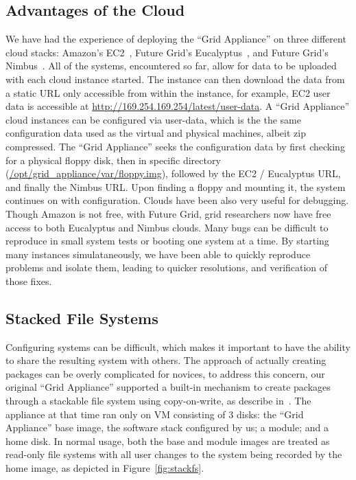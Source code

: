 \documentclass[conference]{IEEEtran}
\begin{document}
\subsection{Advantages of the Cloud}

We have had the experience of deploying the ``Grid Appliance'' on three
different cloud stacks:  Amazon's EC2~\cite{ec2}, Future Grid's
Eucalyptus~\cite{eucalyptus}, and Future Grid's Nimbus~\cite{nimbus}.  All of
the systems, encountered so far, allow for data to be uploaded with each cloud
instance started.  The instance can then download the data from a static URL
only accessible from within the instance, for example, EC2 user data is
accessible at \url{http://169.254.169.254/latest/user-data}. A ``Grid
Appliance'' cloud instances can be configured via user-data, which is the the
same configuration data used as the virtual and physical machines, albeit zip
compressed.  The ``Grid Appliance'' seeks the configuration data by first
checking for a physical floppy disk, then in specific directory
(\url{/opt/grid\_appliance/var/floppy.img}), followed by the EC2 / Eucalyptus
URL, and finally the Nimbus URL.  Upon finding a floppy and mounting it, the
system continues on with configuration.  Clouds have been also very useful for
debugging.  Though Amazon is not free, with Future Grid, grid researchers now
have free access to both Eucalyptus and Nimbus clouds.  Many bugs can be
difficult to reproduce in small system tests or booting one system at a time.
By starting many instances simulataneously, we have been able to quickly
reproduce problems and isolate them, leading to quicker resolutions, and
verification of those fixes.

\subsection{Stacked File Systems}

Configuring systems can be difficult, which makes it important to have the
ability to share the resulting system with others.  The approach of actually
creating packages can be overly complicated for novices, to address this
concern, our original ``Grid Appliance'' supported a built-in mechanism to
create packages through a stackable file system using copy-on-write, as
describe in~\cite{vtdc}.  The appliance at that time ran only on VM consisting
of 3 disks: the ``Grid Appliance'' base image, the software stack configured by
us; a module; and a home disk.  In normal usage, both the base and module
images are treated as read-only file systems with all user changes to the
system being recorded by the home image, as depicted in
Figure~\ref{fig:stackfs}.
\end{document}
